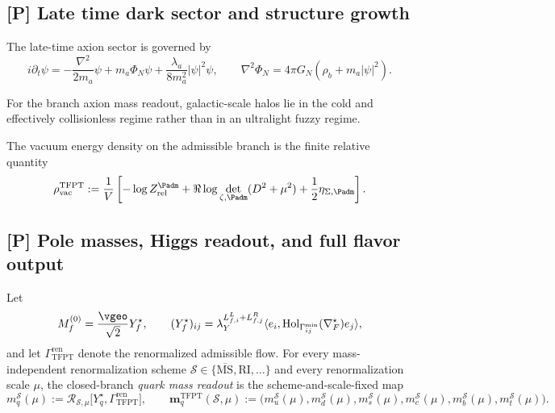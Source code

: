 \subsection{[P] Late time dark sector and structure growth}

\begin{conjecture}
\label{thm:axion_schrodinger_poisson_closure}
The late-time axion sector is governed by
\[
i\partial_t\psi
=
-\frac{\nabla^2}{2m_a}\psi+m_a\Phi_N\psi+\frac{\lambda_a}{8m_a^2}|\psi|^2\psi,
\qquad
\nabla^2\Phi_N=4\pi G_N(\rho_b+m_a|\psi|^2).
\]
\end{conjecture}

\begin{conjecture}
\label{cor:no_fuzzy_halo_regime}
For the branch axion mass readout, galactic-scale halos lie in the cold and effectively
collisionless regime rather than in an ultralight fuzzy regime.
\end{conjecture}

\begin{conjecture}
\label{thm:relative_admissible_vacuum_energy_finiteness}
The vacuum energy density on the admissible branch is the finite relative quantity
\[
\rho_{\mathrm{vac}}^{\mathrm{TFPT}}
:=
\frac1V\left[-\log Z_{\mathrm{rel}}^{\Padm}+\Re\log\det_{\zeta,\Padm}(D^2+\mu^2)+\frac12\eta_{\Sigma,\Padm}\right].
\]
\end{conjecture}

\subsection{[P] Pole masses, Higgs readout, and full flavor output}

\begin{definition}
\label{def:scheme-fixed-yukawa-kernel}
Let
\[
M_f^{(0)}=\frac{\vgeo}{\sqrt2}Y_f^\star,
\qquad
(Y_f^\star)_{ij}
=
\lambda_Y^{L_{f,i}^L+L_{f,j}^R}
\langle e_i,\mathrm{Hol}_{\Gamma_{ij}^{\min}}(\nabla_F^\star)e_j\rangle,
\]
and let $\Gamma_{\mathrm{TFPT}}^{\mathrm{ren}}$ denote the renormalized admissible flow. For every
mass-independent renormalization scheme $\mathcal S\in\{\overline{\mathrm{MS}},\mathrm{RI},\dots\}$
and every renormalization scale $\mu$, the closed-branch \emph{quark mass readout} is the
scheme-and-scale-fixed map
\[
m_q^{\mathcal S}(\mu)
:=
\mathcal R_{\mathcal S,\mu}\bigl[Y_q^\star,\Gamma_{\mathrm{TFPT}}^{\mathrm{ren}}\bigr],
\qquad
\mathbf m_q^{\mathrm{TFPT}}(\mathcal S,\mu)
:=
\bigl(m_u^{\mathcal S}(\mu),m_d^{\mathcal S}(\mu),m_s^{\mathcal S}(\mu),
m_c^{\mathcal S}(\mu),m_b^{\mathcal S}(\mu),m_t^{\mathcal S}(\mu)\bigr).
\]
\end{definition}

